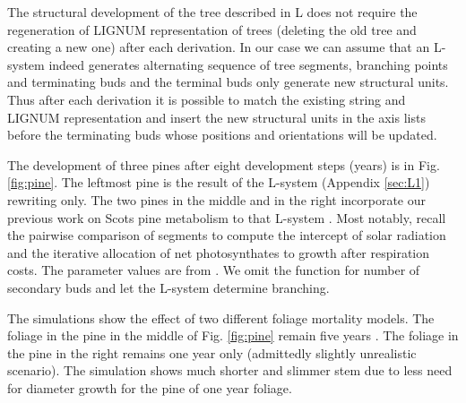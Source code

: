 The structural development of the tree described in L does not require
the regeneration  of LIGNUM representation of trees  (deleting the old
tree and  creating a new one)  after each derivation.  In  our case we
can assume  that an L-system indeed generates  alternating sequence of
tree segments, branching points  and terminating buds and the terminal
buds only  generate new structural units.  Thus  after each derivation
it is possible to match  the existing string and LIGNUM representation
and  insert the  new structural  units in  the axis  lists  before the
terminating buds whose positions and orientations will be updated.

The development  of three pines after eight  development steps (years)
is in  Fig.  \ref{fig:pine}.  The leftmost  pine is the  result of the
L-system (Appendix \ref{sec:L1}) rewriting only.  The two pines in the
middle and  in the right incorporate  our previous work  on Scots pine
metabolism  to  that  L-system  \citep{perttunen:98}.   Most  notably,
recall the pairwise comparison of segments to compute the intercept of
solar radiation and the  iterative allocation of net photosynthates to
growth  after  respiration  costs.   The  parameter  values  are  from
\citet[Table  1]{perttunen:98}.  We  omit the  function for  number of
secondary  buds \citep[][Fig.  2]{perttunen:98}  and let  the L-system
determine branching.

The  simulations show the  effect of  two different  foliage mortality
models. The foliage in the  pine in the middle of Fig.  \ref{fig:pine}
remain five years \citep[][Fig.   2]{perttunen:98}. The foliage in the
pine  in  the  right   remains  one  year  only  (admittedly  slightly
unrealistic scenario).  The simulation  shows much shorter and slimmer
stem due  to less need  for diameter growth  for the pine of  one year
foliage.


